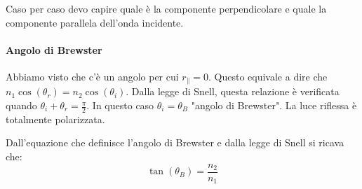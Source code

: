 Caso per caso devo capire quale è la componente perpendicolare e quale la componente parallela dell'onda incidente.

\paragraph{Angolo di Brewster}
Abbiamo visto che c'è un angolo per cui \(r_{\parallel } =0	\). Questo equivale a dire che \(n_1 \cos (\theta _r) = n_2 \cos (\theta _i)\). Dalla legge di Snell, questa relazione è verificata quando \(\theta _i + \theta _r = \frac{\pi}{2}\). In questo caso \(\theta _i = \theta _B\) "angolo di Brewster". La luce riflessa è totalmente polarizzata.
\begin{formula}
	Dall'equazione che definisce l'angolo di Brewster e dalla legge di Snell si ricava che:
	\begin{equation}
		\tan (\theta _B) = \frac{n_2}{n_1}
	\end{equation}
\end{formula}

